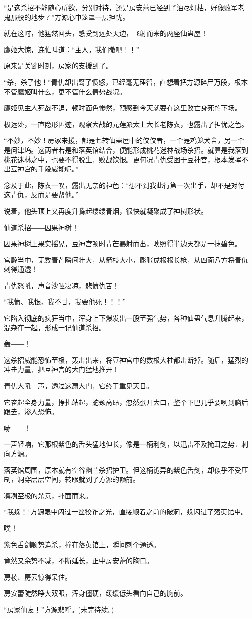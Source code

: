 \begin{this_body}
“是这杀招不能随心所欲，分别对待，还是房安蕾已经到了油尽灯枯，好像败军老鬼那般的地步？”方源心中笼罩一层担忧。

就在这时，他猛然回头，感受到远处天边，飞射而来的两座仙蛊屋！

鹰姬大惊，连忙叫道：“主人，我们撤吧！！”

原来是关键时刻，房家的支援到了。

“杀，杀了他！”青仇却出离了愤怒，已经毫无理智，直想着把方源碎尸万段，根本不管鹰姬叫什么，更不管什么情势战况。

鹰姬见主人死战不退，顿时面色惨然，预感到今天就要在这里败亡身死的下场。

极远处，一直隐形匿迹，观察大战的元莲派太上大长老陈衣，也露出了担忧之色。

“不妙，不妙！房家来援，都是七转仙蛊屋中的佼佼者，一个是鸡笼犬舍，另一个是问津坞。这两者若是和落英馆结合，便能形成桃花迷林战场杀招。就算是我落到桃花迷林之中，也要不得脱生，败战饮恨。更何况青仇受困于豆神宫，根本发挥不出豆神宫的手段威能呢。”

念及于此，陈衣一叹，露出无奈的神色：“想不到我此行第一次出手，却不是对付这青仇，反而是要帮他。”

说着，他头顶上又再度升腾起缕缕青烟，很快就凝聚成了神树形状。

仙道杀招――因果神树！

因果神树上果实摇晃，豆神宫顿时青芒暴射而出，映照得半边天都是一抹碧色。

宫殿当中，无数青芒瞬间壮大，从箭枝大小，膨胀成根根长枪，从四面八方将青仇刺得通透！

青仇怒吼，声音沙哑凄凉，悲愤仇苦！

“我愤、我恨、我不甘，我要他死！！！”

它陷入彻底的疯狂当中，浑身上下爆发出一股至强气势，各种仙蛊气息升腾起来，混杂在一起，形成一记仙道杀招。

轰――！

这杀招威能恐怖至极，轰击出来，将豆神宫中的数根大柱都击断掉。随后，猛烈的冲击力量，把豆神宫的大门猛地推开！

青仇大吼一声，透过这扇大门，它终于重见天日。

它奋起全身力量，挣扎站起，蛇颈高昂，忽然张开大口，整个下巴几乎要咧到脑后跟去，渗人恐怖。

哧――！

一声轻响，它那根紫色的舌头猛地伸长，像是一柄利剑，以迅雷不及掩耳之势，刺向方源。

落英馆周围，原本就有空谷幽兰杀招护卫。但这柄诡异的紫色舌剑，却似乎不受压制，洞穿层层空间，转眼就到了方源的额前。

凛冽至极的杀意，扑面而来。

“我躲！”方源眼中闪过一丝狡诈之光，直接顺着之前的破洞，躲闪进了落英馆中。

噗！

紫色舌剑顺势追杀，撞在落英馆上，瞬间刺个通透。

竟然又余势不减，不断延长，正中房安蕾的胸口。

房棱、房云惊得呆住。

房安蕾陡然睁大双眼，浑身僵硬，缓缓低头看向自己的胸前。

“房家仙友！”方源悲呼。(未完待续。)

\end{this_body}

